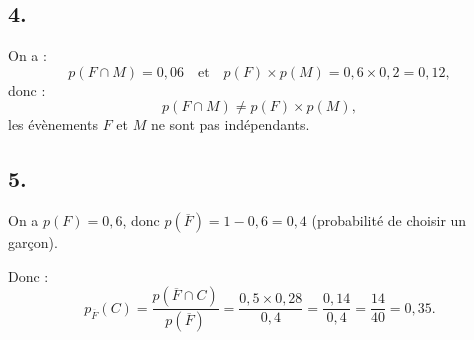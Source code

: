 \subsection*{4.}

On a :
\[
p(F \cap M) = 0{,}06 \quad \text{et} \quad p(F) \times p(M) = 0{,}6 \times 0{,}2 = 0{,}12,
\]
donc :
\[
p(F \cap M) \neq p(F) \times p(M),
\]
les évènements \(F\) et \(M\) ne sont pas indépendants.

\subsection*{5.}

On a \( p(F) = 0{,}6 \), donc \( p(\overline{F}) = 1 - 0{,}6 = 0{,}4 \) (probabilité de choisir un garçon).

Donc :
\[
p_{\overline{F}}(C) = \dfrac{p(\overline{F} \cap C)}{p(\overline{F})} = \dfrac{0{,}5 \times 0{,}28}{0{,}4} = \dfrac{0{,}14}{0{,}4} = \dfrac{14}{40} = 0{,}35.
\]
